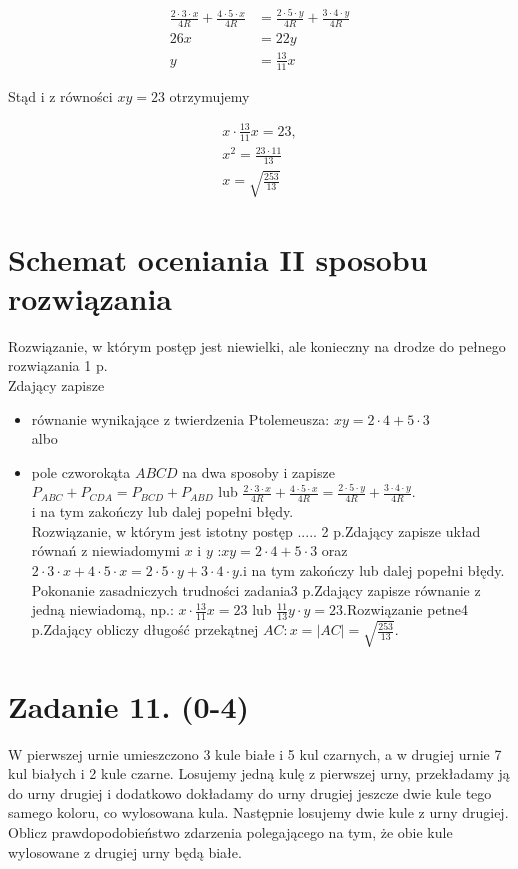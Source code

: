 \documentclass[10pt]{article}
\begin{document}
$$
\begin{aligned}
\frac{2 \cdot 3 \cdot x}{4 R}+\frac{4 \cdot 5 \cdot x}{4 R} & =\frac{2 \cdot 5 \cdot y}{4 R}+\frac{3 \cdot 4 \cdot y}{4 R} \\
26 x & =22 y \\
y & =\frac{13}{11} x
\end{aligned}
$$

Stąd i z równości $x y=23$ otrzymujemy

$$
\begin{gathered}
x \cdot \frac{13}{11} x=23, \\
x^{2}=\frac{23 \cdot 11}{13} \\
x=\sqrt{\frac{253}{13}}
\end{gathered}
$$

\section*{Schemat oceniania II sposobu rozwiązania}
Rozwiązanie, w którym postęp jest niewielki, ale konieczny na drodze do pełnego rozwiązania 1 p.\\
Zdający zapisze

\begin{itemize}
  \item równanie wynikające z twierdzenia Ptolemeusza: $x y=2 \cdot 4+5 \cdot 3$\\
albo
  \item pole czworokąta $A B C D$ na dwa sposoby i zapisze $P_{A B C}+P_{C D A}=P_{B C D}+P_{A B D}$ lub $\frac{2 \cdot 3 \cdot x}{4 R}+\frac{4 \cdot 5 \cdot x}{4 R}=\frac{2 \cdot 5 \cdot y}{4 R}+\frac{3 \cdot 4 \cdot y}{4 R}$.\\
i na tym zakończy lub dalej popełni błędy.\\
Rozwiązanie, w którym jest istotny postęp ..... 2 p.Zdający zapisze układ równań z niewiadomymi $x$ i $y$ :$x y=2 \cdot 4+5 \cdot 3$ oraz $2 \cdot 3 \cdot x+4 \cdot 5 \cdot x=2 \cdot 5 \cdot y+3 \cdot 4 \cdot y$.i na tym zakończy lub dalej popełni błędy.\\
Pokonanie zasadniczych trudności zadania3 p.Zdający zapisze równanie z jedną niewiadomą, np.: $x \cdot \frac{13}{11} x=23$ lub $\frac{11}{13} y \cdot y=23$.Rozwiązanie petne4 p.Zdający obliczy długość przekątnej $A C: x=|A C|=\sqrt{\frac{253}{13}}$.
\end{itemize}

\section*{Zadanie 11. (0-4)}
W pierwszej urnie umieszczono 3 kule białe i 5 kul czarnych, a w drugiej urnie 7 kul białych i 2 kule czarne. Losujemy jedną kulę z pierwszej urny, przekładamy ją do urny drugiej i dodatkowo dokładamy do urny drugiej jeszcze dwie kule tego samego koloru, co wylosowana kula. Następnie losujemy dwie kule z urny drugiej. Oblicz prawdopodobieństwo zdarzenia polegającego na tym, że obie kule wylosowane z drugiej urny będą białe.
\end{document}
